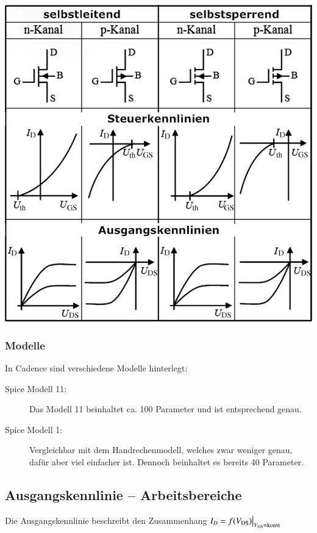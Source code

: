 \begin{minipage}[t]{0.5\columnwidth}
    \includegraphics[width=\columnwidth, align=t]{images/02_MOSFET_uebersicht.pdf}
\end{minipage}



\subsubsection{Modelle}
In Cadence sind verschiedene Modelle hinterlegt:

\smallskip
\begin{description}
    \item[Spice Modell 11:] Das Modell 11 beinhaltet ca. 100 Parameter und ist entsprechend genau.
    \item[Spice Modell 1:] Vergleichbar mit dem Handrechenmodell, welches zwar weniger genau, dafür aber viel einfacher ist. Dennoch beinhaltet es bereits 40 Parameter.
\end{description}


\subsection{Ausgangskennlinie -- Arbeitsbereiche}
 
Die Ausgangskennlinie beschreibt den Zusammenhang $I_D = f(V_{\rm DS}) \big|_{V_{\rm GS} = \text{konst}}$

